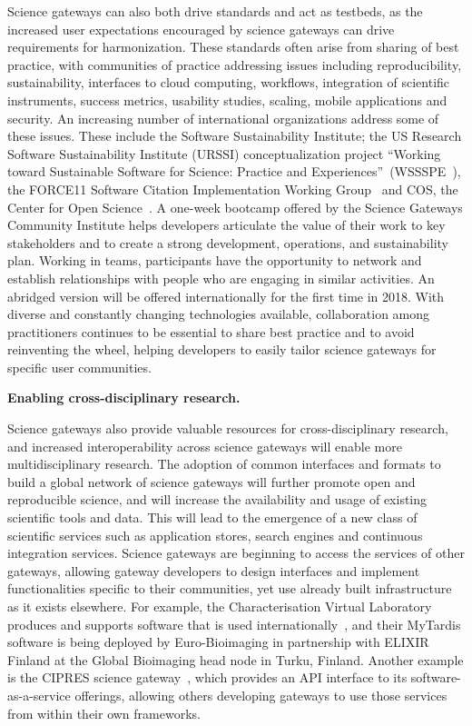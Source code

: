 \documentclass[review]{elsarticle}
\newcommand{\changedtext}[1]{
	{#1}
}
\begin{document}
Science gateways can also both drive standards and act as testbeds, as the increased user expectations encouraged by science gateways can drive requirements for harmonization. These standards often arise from sharing of best practice, with communities of practice addressing issues including reproducibility, sustainability, interfaces to cloud computing, workflows, integration of scientific instruments, success metrics, usability studies, scaling, mobile applications and security. 
An increasing number of international organizations address some of these issues. These include the Software Sustainability Institute; the US Research Software Sustainability Institute (URSSI) conceptualization project ``Working toward Sustainable Software for Science: Practice and Experiences''~(WSSSPE~\cite{wssspe}), the FORCE11 Software Citation Implementation Working Group~\cite{force11-39} and COS, the Center for Open Science~\cite{cio}. 
A one-week bootcamp offered by the Science Gateways Community Institute helps developers articulate the value of their work to key stakeholders and to create a strong development, operations, and sustainability plan. Working in teams, participants have the opportunity to network and establish relationships with people who are engaging in similar activities. An abridged version will be offered internationally for the first time in 2018. With diverse and constantly changing technologies available, collaboration among practitioners continues to be essential to share best practice and to avoid reinventing the wheel, helping developers to easily tailor science gateways for specific user communities.

\changedtext{\textbf{Enabling cross-disciplinary research.}}
Science gateways also provide valuable resources for cross-disciplinary research, and increased interoperability across science gateways will enable more multidisciplinary research. The adoption of common interfaces and formats to build a global network of science gateways will further promote open and reproducible science, and will increase the availability and usage of existing scientific tools and data. This will lead to the emergence of a new class of scientific services such as application stores, search engines and continuous integration services. 
Science gateways are beginning to access the services of other gateways, allowing gateway developers to design interfaces and implement functionalities specific to their communities, yet use already built infrastructure as it exists elsewhere. 
For example, the Characterisation Virtual Laboratory produces and supports software that is used internationally~\cite{cvl}, and their MyTardis software is being deployed by Euro-Bioimaging in partnership with ELIXIR Finland at the Global Bioimaging head node in Turku, Finland. 
Another example is the CIPRES science gateway~\cite{Miller2012-40}, which provides an API interface to its software-as-a-service offerings, allowing others developing gateways to use those services from within their own frameworks.
\end{document}
